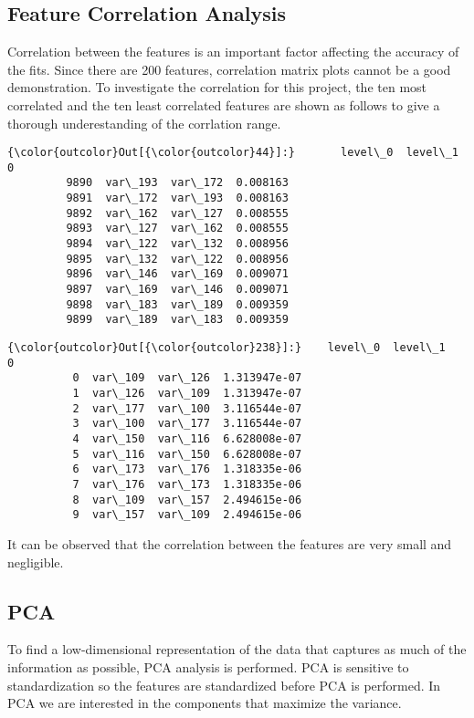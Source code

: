 \documentclass[11pt]{article}
\begin{document}
    \hypertarget{feature-correlation-analysis}{%
\subsection{Feature Correlation
Analysis}\label{feature-correlation-analysis}}
Correlation between the features is an important factor affecting the accuracy of the fits. Since there are 200 features, correlation matrix plots cannot be a good demonstration. To investigate the correlation for this project, the ten most correlated and the ten least correlated features are shown as follows to give a thorough underestanding of the corrlation range. 
\begin{Verbatim}[commandchars=\\\{\}]
{\color{outcolor}Out[{\color{outcolor}44}]:}       level\_0  level\_1         0
         9890  var\_193  var\_172  0.008163
         9891  var\_172  var\_193  0.008163
         9892  var\_162  var\_127  0.008555
         9893  var\_127  var\_162  0.008555
         9894  var\_122  var\_132  0.008956
         9895  var\_132  var\_122  0.008956
         9896  var\_146  var\_169  0.009071
         9897  var\_169  var\_146  0.009071
         9898  var\_183  var\_189  0.009359
         9899  var\_189  var\_183  0.009359
\end{Verbatim}
            
\begin{Verbatim}[commandchars=\\\{\}]
{\color{outcolor}Out[{\color{outcolor}238}]:}    level\_0  level\_1             0
          0  var\_109  var\_126  1.313947e-07
          1  var\_126  var\_109  1.313947e-07
          2  var\_177  var\_100  3.116544e-07
          3  var\_100  var\_177  3.116544e-07
          4  var\_150  var\_116  6.628008e-07
          5  var\_116  var\_150  6.628008e-07
          6  var\_173  var\_176  1.318335e-06
          7  var\_176  var\_173  1.318335e-06
          8  var\_109  var\_157  2.494615e-06
          9  var\_157  var\_109  2.494615e-06
\end{Verbatim}
            
    It can be observed that the correlation between the features are very
small and negligible.

    \hypertarget{pca}{%
\subsection{PCA}\label{pca}}

    To find a low-dimensional representation of the data that captures as
much of the information as possible, PCA analysis is performed. PCA is
sensitive to standardization so the features are standardized before PCA
is performed. In PCA we are interested in the components that maximize
the variance.
\end{document}
